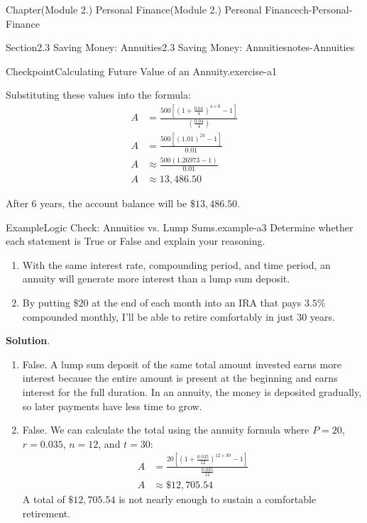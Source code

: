 \documentclass[oneside,10pt,]{book}
\newcommand{\blocktitlefont}{\relax}
\newcommand{\ptxlistdisc}{\raisebox{0.3ex}{\textbullet}}
\newcommand{\amp}{&}
\begin{document}
\begin{chapterptx}{Chapter}{(Module 2.) Personal Finance}{}{(Module 2.) Personal Finance}{}{}{ch-Personal-Finance}
\begin{sectionptx}{Section}{2.3 Saving Money: Annuities}{}{2.3 Saving Money: Annuities}{}{}{notes-Annuities}
\begin{inlineexercise}{Checkpoint}{Calculating Future Value of an Annuity.}{exercise-a1}
\begin{itemize}[label=\ptxlistdisc]
\end{itemize}
%
\par
Substituting these values into the formula:%
\begin{align*}
A \amp = \frac{500\left[\left(1 + \frac{0.04}{4}\right)^{4 \times 6} - 1\right]}{\left(\frac{0.04}{4}\right)}\\
A \amp = \frac{500\left[(1.01)^{24} - 1\right]}{0.01}\\
A \amp \approx \frac{500(1.26973 - 1)}{0.01}\\
A \amp \approx 13,486.50
\end{align*}
%
\par
After \(6\) years, the account balance will be \(\$13,486.50\).%
\end{inlineexercise}%
\begin{example}{Example}{Logic Check: Annuities vs. Lump Sums.}{example-a3}%
Determine whether each statement is True or False and explain your reasoning.%
\begin{enumerate}[label={\arabic*}]
\item{}With the same interest rate, compounding period, and time period, an annuity will generate more interest than a lump sum deposit.%
\item{}By putting \(\$20\) at the end of each month into an IRA that pays \(3.5\%\) compounded monthly, I'll be able to retire comfortably in just 30 years.%
\end{enumerate}
%
\par\smallskip%
\noindent\textbf{\blocktitlefont Solution}.\hypertarget{example-a3-3}{}\quad{}%
\begin{enumerate}[label={\arabic*}]
\item{}False. A lump sum deposit of the same total amount invested earns more interest because the entire amount is present at the beginning and earns interest for the full duration. In an annuity, the money is deposited gradually, so later payments have less time to grow.%
\item{}False. We can calculate the total using the annuity formula where \(P=20\), \(r=0.035\), \(n=12\), and \(t=30\):%
\begin{align*}
A \amp = \frac{20\left[(1 + \frac{0.035}{12})^{12 \times 30} - 1\right]}{\frac{0.035}{12}}\\
A \amp \approx \$12,705.54
\end{align*}
A total of \(\$12,705.54\) is not nearly enough to sustain a comfortable retirement.%
\end{enumerate}
%
\end{example}

\end{sectionptx}
\end{chapterptx}
\end{document}
